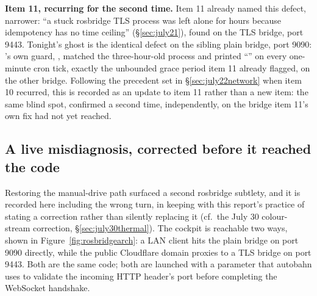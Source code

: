 \noindent\textbf{Item 11, recurring for the second time.} Item 11 already
named this defect, narrower: ``a stuck rosbridge TLS process was left alone
for hours because idempotency has no time ceiling'' (\S\ref{sec:july21}),
found on the TLS bridge, port 9443. Tonight's 
ghost is the identical defect on the sibling plain bridge, port 9090:
's own guard, ,
matched the three-hour-old process and printed ``'' on every one-minute 
cron tick, exactly the unbounded grace period item 11 already flagged, on
the other bridge. Following the precedent set in \S\ref{sec:july22network}
when item 10 recurred, this is recorded as an update to item 11 rather than
a new item: the same blind spot, confirmed a second time, independently, on
the bridge item 11's own fix had not yet reached.

\subsection{A live misdiagnosis, corrected before it reached the code}
\label{sec:aug11rosbridge}

Restoring the manual-drive path surfaced a second rosbridge subtlety, and it
is recorded here including the wrong turn, in keeping with this report's
practice of stating a correction rather than silently replacing it
(cf.\ the July 30 colour-stream correction, \S\ref{sec:july30thermal}). The
cockpit is reachable two ways, shown in Figure~\ref{fig:rosbridgearch}: a LAN
client hits the plain bridge on port 9090 directly, while the public
Cloudflare domain proxies to a TLS bridge on port 9443. Both are the same
 code; both are launched with a
 parameter that autobahn uses to validate
the incoming HTTP  header's port before completing the WebSocket
handshake.

